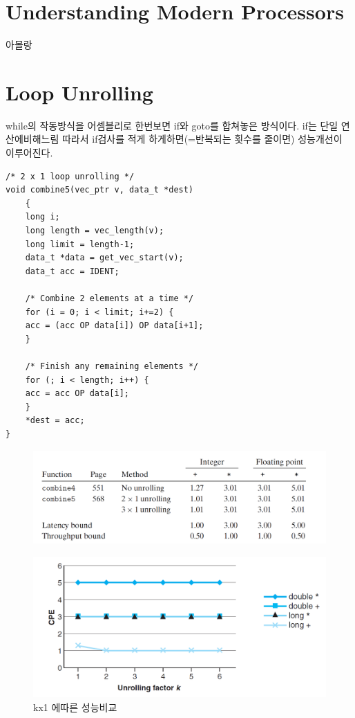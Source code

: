 \section{Understanding Modern Processors}

아몰랑


\section{Loop Unrolling}

while의 작동방식을 어셈블리로 한번보면 
if와  goto를 합쳐놓은 방식이다.
if는 단일 연산에비해느림 따라서
if검사를 적게 하게하면(=반복되는 횟수를 줄이면) 성능개선이 이루어진다.

\begin{lstlisting}[style = CStyle]
/* 2 x 1 loop unrolling */
void combine5(vec_ptr v, data_t *dest)
    {
    long i;
    long length = vec_length(v);
    long limit = length-1;
    data_t *data = get_vec_start(v);
    data_t acc = IDENT;

    /* Combine 2 elements at a time */
    for (i = 0; i < limit; i+=2) {
    acc = (acc OP data[i]) OP data[i+1];
    }

    /* Finish any remaining elements */
    for (; i < length; i++) {
    acc = acc OP data[i];
    }
    *dest = acc;
}
\end{lstlisting}


\begin{figure}[h!]
    \centering
    \includegraphics[scale=0.3]{pic/section5/pic5}
\end{figure}


\begin{figure}[h!]
    \centering
    \includegraphics[scale=0.4]{pic/section5/pic6}
    \caption{ kx1 에따른 성능비교}
\end{figure}


